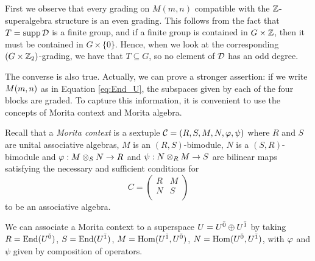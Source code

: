 First we observe that every grading on $M(m,n)$ compatible with the $\mathbb{Z}$-superalgebra structure is an even grading. This follows from the fact that $T=\operatorname{supp} \mathcal{D}$ is a finite group, and if a finite group is contained in $G\times \mathbb{Z}$, then it must be contained in $G\times \{0\}$. Hence, when we look at the corresponding $(G\times\mathbb{Z}_2)$-grading, we have that $T\subseteq G$, so no element of $\mathcal{D}$ has an odd degree.

The converse is also true. Actually, we can prove a stronger assertion: if we write $M(m,n)$ as in Equation \eqref{eq:End_U}, the subspaces given by each of the four blocks are graded. To capture this information, it is convenient to use the concepts of Morita context and Morita algebra.

Recall that a \emph{Morita context} is a sextuple $\mathcal{C} = (R, S, M, N, \varphi, \psi )$ where $R$ and $S$ are unital associative algebras, $M$ is an $(R,S)$-bimodule, $N$ is a $(S,R)$-bimodule and $\varphi: M\otimes_{S} N\rightarrow R$ and $\psi: N\otimes_{R} M\rightarrow S$ are bilinear maps satisfying the necessary and sufficient conditions for
\begin{equation*}
	C = \left(\begin{matrix}\label{eq:morita-algebra}
		R   &  M\\
		N   &  S\\
	\end{matrix}
	\right)
\end{equation*}
to be an associative algebra.%

We can associate a Morita context to a superspace $U = U^{\bar0} \oplus U^{\bar1}$ by taking $R = \operatorname{End}(U^{\bar0})$, $S = \operatorname{End}(U^{\bar1})$, $M = \operatorname{Hom}(U^{\bar1}, U^{\bar0})$, 
$N = \operatorname{Hom} (U^{\bar0}, U^{\bar1})$, with $\varphi$ and $\psi$ given by composition of operators.


